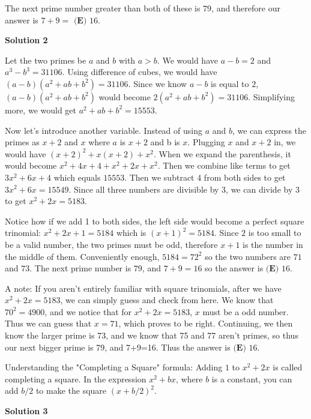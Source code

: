 \begin{enumerate}
 The next prime number greater than both of these is $79$, and therefore our answer is \( 7 + 9 = \) $\boxed{\textbf{(E) }16}$.

 



\textbf{Solution 2}

Let the two primes be $a$ and $b$ with $a>b$. We would have $a-b=2$ and $a^{3}-b^{3}=31106$. Using difference of cubes, we would have $(a-b)(a^{2}+ab+b^{2})=31106$. Since we know $a-b$ is equal to $2$, $(a-b)(a^{2}+ab+b^{2})$ would become $2(a^{2}+ab+b^{2})=31106$. Simplifying more, we would get $a^{2}+ab+b^{2}=15553$.

 Now let's introduce another variable. Instead of using $a$ and $b$, we can express the primes as $x+2$ and $x$ where $a$ is $x+2$ and b is $x$. Plugging $x$ and $x+2$ in, we would have $(x+2)^{2}+x(x+2)+x^{2}$. When we expand the parenthesis, it would become $x^{2}+4x+4+x^{2}+2x+x^{2}$. Then we combine like terms to get $3x^{2}+6x+4$ which equals $15553$. Then we subtract 4 from both sides to get $3x^{2}+6x=15549$. Since all three numbers are divisible by 3, we can divide by 3 to get $x^{2}+2x=5183$.

 Notice how if we add 1 to both sides, the left side would become a perfect square trinomial: $x^{2}+2x+1=5184$ which is $(x+1)^{2}=5184$. Since $2$ is too small to be a valid number, the two primes must be odd, therefore $x+1$ is the number in the middle of them. Conveniently enough, $5184=72^{2}$ so the two numbers are $71$ and $73$. The next prime number is $79$, and $7+9=16$ so the answer is  $\boxed{\textbf{(E) }16}$.

 A note: If you aren't entirely familiar with square trinomials, after we have $x^{2}+2x=5183$, we can simply guess and check from here. We know that $70^{2} = 4900$, and we notice that for $x^{2}+2x=5183$, $x$ must be a odd number. Thus we can guess that $x=71$, which proves to be right. Continuing, we then know the larger prime is 73, and we know that 75 and 77 aren't primes, so thus our next bigger prime is 79, and 7+9=16. Thus the answer is $\boxed{\textbf{(E) }16}$.

 Understanding the "Completing a Square" formula: Adding $1$ to $x^{2}+2x$ is called completing a square. In the expression $x^{2}+bx$, where $b$ is a constant, you can add $b/{2}$ to make the square $(x+b/{2})^{2}$.

 



\textbf{Solution 3}


\end{enumerate}
